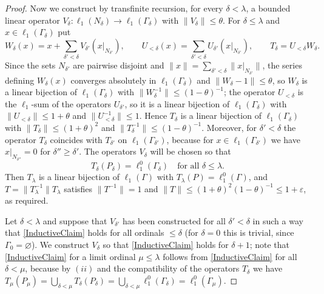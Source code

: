 \documentclass[12pt]{article}
\newcommand{\lo}[1]{\ell_1^0(#1)}
\newcommand{\ellone}[1]{\ell_1(#1)}
\newcommand{\norm}[1]{\lVert #1\rVert}
\begin{document}
\begin{proof}
    Now we construct by transfinite recursion, for every
    $\delta<\lambda$, a bounded linear operator
    $V_\delta:\ellone{N_\delta}\to\ellone{\Gamma_\delta}$ with
    $\norm{V_\delta}\leq\theta$. For $\delta\leq\lambda$ and
    $x\in\ellone{\Gamma_\delta}$ put
    \[
    W_\delta(x)=x+\sum_{\delta'<\delta}V_{\delta'}(x|_{N_{\delta'}}),\qquad
    U_{<\delta}(x)=\sum_{\delta'<\delta}U_{\delta'}(x|_{N_{\delta'}}),\qquad
    T_\delta=U_{<\delta}W_\delta.
    \]
    Since the sets $N_{\delta'}$ are pairwise disjoint and
    $\norm{x}=\sum_{\delta'<\delta}\norm{x|_{N_{\delta'}}}$, the series defining
    $W_\delta(x)$ converges absolutely in $\ellone{\Gamma_\delta}$ and
    $\norm{W_\delta-1}\leq\theta$, so $W_\delta$ is a linear bijection of
    $\ellone{\Gamma_\delta}$ with $\norm{W_\delta^{-1}}\leq{(1-\theta)}^{-1}$;
    the operator $U_{<\delta}$ is the $\ell_1$-sum of the operators
    $U_{\delta'}$, so it is a linear bijection of $\ellone{\Gamma_\delta}$ with
    $\norm{U_{<\delta}}\leq 1+\theta$ and $\norm{U_{<\delta}^{-1}}\leq 1$.
    Hence $T_\delta$ is a linear bijection of $\ellone{\Gamma_\delta}$ with
    $\norm{T_\delta}\leq{(1+\theta)}^2$ and $\norm{T_\delta^{-1}}\leq{(1-\theta)}^{-1}$.
    Moreover, for $\delta'<\delta$ the operator $T_\delta$ coincides with
    $T_{\delta'}$ on $\ellone{\Gamma_{\delta'}}$, because for
    $x\in\ellone{\Gamma_{\delta'}}$ we have $x|_{N_{\delta''}}=0$ for
    $\delta''\geq\delta'$. The operators $V_\delta$ will be chosen so that
    \begin{equation}\label{InductiveClaim}
    T_\delta(P_\delta)=\lo{\Gamma_\delta}\quad\text{for all }\delta\leq\lambda.
    \end{equation}
    Then $T_\lambda$ is a linear bijection of $\ellone{\Gamma}$ with
    $T_\lambda(P)=\lo{\Gamma}$, and $T=\norm{T_\lambda^{-1}}T_\lambda$
    satisfies $\norm{T^{-1}}=1$ and
    $\norm{T}\leq{(1+\theta)}^2{(1-\theta)}^{-1}\leq 1+\varepsilon$, as
    required.

    Let $\delta<\lambda$ and suppose that $V_{\delta'}$ has been constructed
    for all $\delta'<\delta$ in such a way that \eqref{InductiveClaim} holds
    for all ordinals $\leq\delta$ (for $\delta=0$ this is trivial, since
    $\Gamma_0=\varnothing$). We construct $V_\delta$ so that
    \eqref{InductiveClaim} holds for $\delta+1$; note that
    \eqref{InductiveClaim} for a limit ordinal $\mu\leq\lambda$ follows from
    \eqref{InductiveClaim} for all $\delta<\mu$, because by $(ii)$ and the
    compatibility of the operators $T_\delta$ we have
    $T_\mu(P_\mu)=\bigcup_{\delta<\mu}T_\delta(P_\delta)
    =\bigcup_{\delta<\mu}\lo{\Gamma_\delta}=\lo{\Gamma_\mu}$.


\end{proof}
\end{document}
